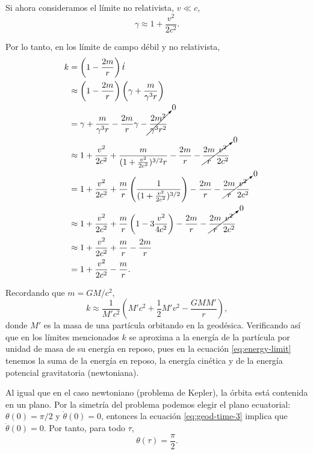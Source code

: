 \documentclass[letterpaper,11pt]{article}
\begin{document}
Si ahora consideramos el límite no relativista, $v \ll c$, 
\begin{equation}
\gamma \approx 1 + \frac{v^2}{2c^2}.
\end{equation}

Por lo tanto, en los límite de campo débil y no relativista,
\begin{align}
k &= \left(1 - \frac{2m}{r} \right) \dot{t} \nonumber\\
&\approx  \left(1 - \frac{2m}{r} \right) \left(\gamma + \frac{m}{\gamma^3 r} \right) \nonumber\\
&=  \gamma + \frac{m}{\gamma^3r} - \frac{2m}{r} \gamma - \cancelto{0}{\frac{2m^2}{\gamma^3 r^2}} \nonumber\\
&\approx 1 + \frac{v^2}{2c^2} + \frac{m}{(1 + \frac{v^2}{2c^2})^{3/2} r} - \frac{2m}{r} - \cancelto{0}{\frac{2m}{r} \frac{v^2}{2c^2}} \nonumber\\
&= 1 + \frac{v^2}{2c^2} + \frac{m}{r} \left( \frac{1}{(1 + \frac{v^2}{2c^2})^{3/2}} \right) - \frac{2m}{r} - \cancelto{0}{\frac{2m}{r} \frac{v^2}{2c^2}} \nonumber \\
&\approx 1 + \frac{v^2}{2c^2} + \frac{m}{r} \left( 1 - 3 \frac{v^2}{4c^2} \right) - \frac{2m}{r} - \cancelto{0}{\frac{2m}{r} \frac{v^2}{2c^2}}\nonumber \\
&\approx 1 + \frac{v^2}{2c^2} + \frac{m}{r} - \frac{2m}{r} \nonumber\\
&= 1 + \frac{v^2}{2c^2} - \frac{m}{r}.
\end{align}

Recordando que $m = GM/c^2$,
\begin{equation} \label{eq:energy-limit}
k \approx \frac{1}{M'c^2}\left( M'c^2 + \frac{1}{2} M' v^2 - \frac{GM M'}{r} \right),
\end{equation}
donde $M'$ es la masa de una partícula orbitando en la geodésica. Verificando así que en los límites mencionados $k$ se aproxima a la energía de la partícula por unidad de masa de su energía en reposo, pues en la ecuación \eqref{eq:energy-limit} tenemos la suma de la energía en reposo, la energía cinética y de la energía potencial gravitatoria (newtoniana).


Al igual que en el caso newtoniano (problema de Kepler), la órbita está contenida en un plano. Por la simetría del problema podemos elegir el plano ecuatorial: $\theta(0) = \pi/2$ y $\dot{\theta}(0) = 0$, entonces la ecuación \eqref{eq:geod-time-3} implica que $\ddot{\theta}(0) = 0$. Por tanto, para todo $\tau$,
\begin{equation} \label{eq:theta-sol}
\theta(\tau) = \frac{\pi}{2}.
\end{equation}
\end{document}
